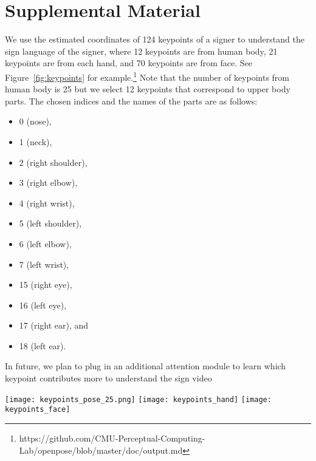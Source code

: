 \documentclass[10pt,twocolumn,letterpaper]{article}
\begin{document}
\clearpage{\small


}

\newpage

\onecolumn
\section{Supplemental Material}



 We use the estimated coordinates of 124 keypoints of a signer to understand the sign language of the signer, where 12 keypoints are from human body, 21 keypoints are from each hand, and 70 keypoints are from face. See Figure~\ref{fig:keypoints} for example.\footnote{https://github.com/CMU-Perceptual-Computing-Lab/openpose/blob/master/doc/output.md} Note that the number of keypoints from human body is 25 but we select 12 keypoints that correspond to upper body parts. The chosen indices and the names of the parts are as follows:
\begin{itemize}
    \item 0 (nose),
    \item 1 (neck),
    \item 2 (right shoulder),
    \item 3 (right elbow),
    \item 4 (right wrist), 
    \item 5 (left shoulder), 
    \item 6 (left elbow), 
    \item 7 (left wrist), 
    \item 15 (right eye), 
    \item 16 (left eye), 
    \item 17 (right ear), and 
    \item 18 (left ear).
\end{itemize}

In future, we plan to plug in an additional attention module to learn which keypoint contributes more to understand the sign video 
\\

\begin{figure*}[ht]
\centering
\texttt{[image: keypoints\_pose\_25.png]}
\texttt{[image: keypoints\_hand]}
\texttt{[image: keypoints\_face]}
\caption{The human keypoints used for sign language recognition. Note that the figures are borrowed from the public web page of the OpenPose project~\cite{CaoSWS17,SimonJMS17,WeiRKS16}.}
\label{fig:keypoints}
\end{figure*}
\end{document}
